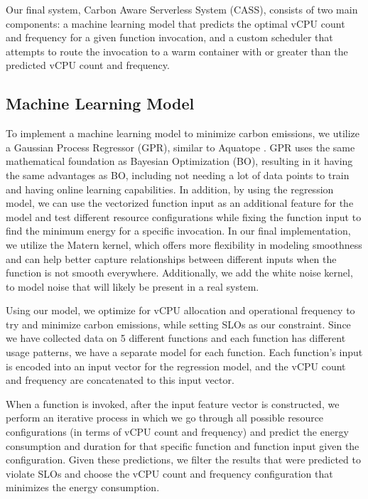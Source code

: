 \documentclass[times, 10pt,twocolumn]{article}
\begin{document}
Our final system, Carbon Aware Serverless System (CASS), consists of two main components: a machine learning model that predicts the optimal vCPU count and frequency for a given function invocation, and a custom scheduler that attempts to route the invocation to a warm container with or greater than the predicted vCPU count and frequency.

\subsection{Machine Learning Model}
To implement a machine learning model to minimize carbon emissions, we utilize a Gaussian Process Regressor (GPR), similar to Aquatope  \cite{aquatope}. GPR uses the same mathematical foundation as Bayesian Optimization (BO), resulting in it having the same advantages as BO, including not needing a lot of data points to train and having online learning capabilities. In addition, by using the regression model, we can use the vectorized function input as an additional feature for the model and test different resource configurations while fixing the function input to find the minimum energy for a specific invocation. In our final implementation, we utilize the Matern kernel, which offers more flexibility in modeling smoothness and can help better capture relationships between different inputs when the function is not smooth everywhere. Additionally, we add the white noise kernel, to model noise that will likely be present in a real system. 

Using our model, we optimize for vCPU allocation and operational frequency to try and minimize carbon emissions, while setting SLOs as our constraint. Since we have collected data on 5 different functions and each function has different usage patterns, we have a separate model for each function. Each function's input is encoded into an input vector for the regression model, and the vCPU count and frequency are concatenated to this input vector.

When a function is invoked, after the input feature vector is constructed, we perform an iterative process in which we go through all possible resource configurations (in terms of vCPU count and frequency) and predict the energy consumption and duration for that specific function and function input given the configuration. Given these predictions, we filter the results that were predicted to violate SLOs and choose the vCPU count and frequency configuration that minimizes the energy consumption. 
\end{document}
